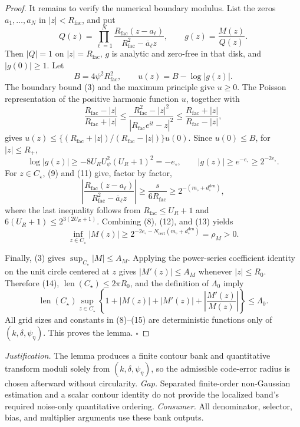 \documentclass{article}
\begin{document}
\begin{proof}
It remains to verify the numerical boundary modulus.  List the zeros \(a_1,\ldots,a_N\) in \(|z|<R_{\mathrm{fac}}\), and put
\[
 Q(z)=\prod_{\ell=1}^N
 \frac{R_{\mathrm{fac}}(z-a_\ell)}{R_{\mathrm{fac}}^2-\overline a_\ell z},
 \qquad g(z)=\frac{M(z)}{Q(z)}. \tag{11}
\]
Then \(|Q|=1\) on \(|z|=R_{\mathrm{fac}}\), \(g\) is analytic and zero-free in that disk, and \(|g(0)|\ge1\).  Let
\[
 B=4\psi^2R_{\mathrm{fac}}^2,
 \qquad u(z)=B-\log|g(z)|.
\]
The boundary bound (3) and the maximum principle give \(u\ge0\).  The Poisson representation of the positive harmonic function \(u\), together with
\[
 \frac{R_{\mathrm{fac}}-|z|}{R_{\mathrm{fac}}+|z|}
 \le \frac{R_{\mathrm{fac}}^2-|z|^2}{|R_{\mathrm{fac}}e^{it}-z|^2}
 \le\frac{R_{\mathrm{fac}}+|z|}{R_{\mathrm{fac}}-|z|},
\]
gives \(u(z)\le\{(R_{\mathrm{fac}}+|z|)/(R_{\mathrm{fac}}-|z|)\}u(0)\).  Since \(u(0)\le B\), for \(|z|\le R_+\),
\[
 \log|g(z)|
 \ge-8U_RU_\psi^2(U_R+1)^2=-e_\circ,
 \qquad |g(z)|\ge e^{-e_\circ}\ge2^{-2e_\circ}. \tag{12}
\]
For \(z\in C_\star\), (9) and (11) give, factor by factor,
\[
 \left|\frac{R_{\mathrm{fac}}(z-a_\ell)}
 {R_{\mathrm{fac}}^2-\overline a_\ell z}\right|
 \ge\frac{s}{6R_{\mathrm{fac}}}
 \ge2^{-(m_\circ+d_\circ^{\mathrm{den}})}, \tag{13}
\]
where the last inequality follows from \(R_{\mathrm{fac}}\le U_R+1\) and \(6(U_R+1)\le2^{3(2U_R+1)}\).  Combining (8), (12), and (13) yields
\[
 \inf_{z\in C_\star}|M(z)|
 \ge2^{-2e_\circ-N_{\mathrm{cert}}(m_\circ+d_\circ^{\mathrm{den}})}
 =\rho_M>0. \tag{14}
\]

Finally, (3) gives \(\sup_{C_\star}|M|\le A_M\).  Applying the power-series coefficient identity on the unit circle centered at \(z\) gives \(|M'(z)|\le A_M\) whenever \(|z|\le R_0\).  Therefore (14), \(\operatorname{len}(C_\star)\le2\pi R_0\), and the definition of \(\Lambda_0\) imply
\[
 \operatorname{len}(C_\star)\sup_{z\in C_\star}
 \left\{1+|M(z)|+|M'(z)|+\left|\frac{M'(z)}{M(z)}\right|\right\}
 \le\Lambda_0. \tag{15}
\]
All grid sizes and constants in (8)--(15) are deterministic functions only of \((k,\delta,\psi_\eta)\).  This proves the lemma. \(\square\)
\end{proof}
\par\smallskip\noindent \textit{Justification.} The lemma produces a finite contour bank and quantitative transform moduli solely from \((k,\delta,\psi_\eta)\), so the admissible code-error radius is chosen afterward without circularity. \textit{Gap.} Separated finite-order non-Gaussian estimation and a scalar contour identity do not provide the localized band's required noise-only quantitative ordering. \textit{Consumer.} All denominator, selector, bias, and multiplier arguments use these bank outputs.
\end{document}
